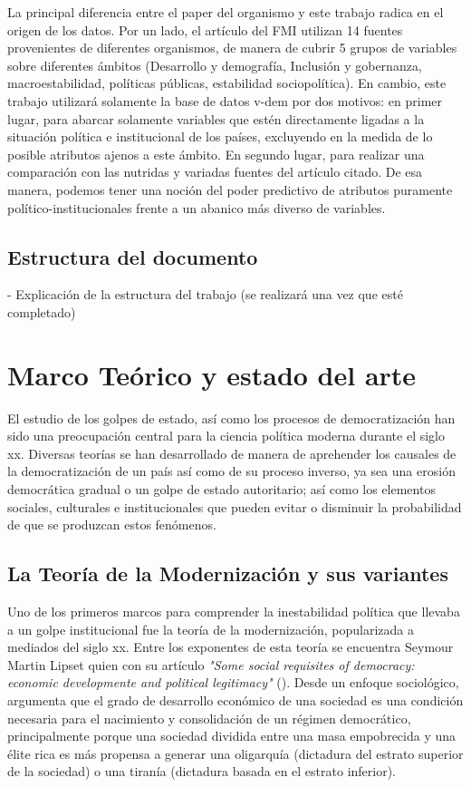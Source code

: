\documentclass{article}
\begin{document}
La principal diferencia entre el paper del organismo y este trabajo radica en el origen
de los datos. Por un lado, el artículo del FMI utilizan 14 fuentes provenientes de 
diferentes organismos, de manera de cubrir 5 grupos de variables sobre diferentes ámbitos 
(Desarrollo y demografía, Inclusión y gobernanza, macroestabilidad, políticas públicas, 
estabilidad sociopolítica). En cambio, este trabajo utilizará solamente la base de datos 
v-dem por dos motivos: en primer lugar, para abarcar solamente variables que estén 
directamente ligadas a la situación política e institucional de los países, excluyendo en 
la medida de lo posible atributos ajenos a este ámbito. En segundo lugar, para realizar 
una comparación con las nutridas y variadas fuentes del artículo citado. De esa manera, 
podemos tener una noción del poder predictivo de atributos puramente 
político-institucionales frente a un abanico más diverso de variables.

\subsection{Estructura del documento}
- Explicación de la estructura del trabajo (se realizará una vez que esté completado)


\section{Marco Teórico y estado del arte}

El estudio de los golpes de estado, así como los procesos de democratización han sido una 
preocupación central para la ciencia política moderna durante el siglo xx. Diversas teorías
se han desarrollado de manera de aprehender los causales de la democratización
de un país así como de su proceso inverso, ya sea una erosión democrática gradual o un
golpe de estado autoritario; así como los elementos sociales, culturales e institucionales 
que pueden evitar o disminuir la probabilidad de que se produzcan estos fenómenos.

\subsection{La Teoría de la Modernización y sus variantes}

Uno de los primeros marcos para comprender la inestabilidad política que llevaba a un golpe
institucional fue la teoría de la modernización, popularizada a mediados del siglo xx. 
Entre los exponentes de esta teoría se
encuentra Seymour Martin Lipset quien con su artículo \textit{"Some social requisites 
of democracy: economic developmente and political legitimacy"} (\citeyear{lipset1959some}). 
Desde un enfoque sociológico, 
argumenta que el grado de desarrollo económico de una sociedad es una condición 
necesaria para el nacimiento y consolidación de un régimen democrático, principalmente
porque una sociedad dividida entre una masa empobrecida y una élite rica es más
propensa a generar una oligarquía (dictadura del estrato superior de la sociedad) o una
tiranía (dictadura basada en el estrato inferior).
\end{document}
